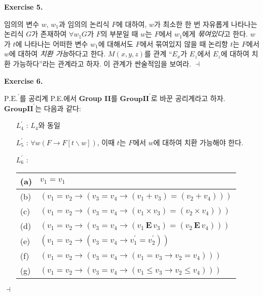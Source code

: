 \documentclass[12pt]{paper}
\newenvironment{context}[1][]
{ \noindent \textbf{{#1}.}
}
{ \hfill $ \dashv $ }
\begin{document}
\begin{context}[Exercise 5]
임의의 변수 $w$, $w_1$과 임의의 논리식 $F$에 대하여,
$w$가 최소한 한 번 자유롭게 나타나는 논리식 $G$가 존재하여
$\forall w_1 G$가 $F$의 부분일 때
$w$는 $F$에서 $w_1$에게 \textit{묶여있다}고 한다.
$w$가 $t$에 나타나는 어떠한 변수 $w_1$에 대해서도 $F$에서 묶여있지 않을 때
논리항 $t$는 $F$에서 $w$에 대하여 \textit{치환 가능}하다고 한다.
$M \left( x , y , z \right)$를 관계 ``$E_x$가 $E_z$에서 $E_z$에 대하여 치환 가능하다''라는 관계라고 하자.
이 관계가 싼술적임을 보여라.
\end{context}

\begin{context}[Exercise 6]
$\mathrm{P.E.}^{\prime}$를 공리계 P.E.에서 \textbf{Group II}를 $\mathbf{Group II}^{\prime}$로 바꾼 공리계라고 하자. \\
$\mathbf{Group II}^{\prime}$는 다음과 같다:
\begin{enumerate}
\item [$L_4^{\prime}$]: $L_4$와 동일
\item [$L_5^{\prime}$]: $\forall w \left( F \rightarrow F \left[ t \backslash w \right] \right)$,
이때 $t$는 $F$에서 $w$에 대하여 치환 가능해야 한다.
\item [$L_6^{\prime}$]:
\begin{tabular}{|l|l|} \hline
(a) & $ v_1 = v_1 $ \\ \hline
(b) & $ \left( v_1 = v_2 \rightarrow \left( v_3 = v_4 \rightarrow \left( v_1 + v_3 \right) = \left( v_2 + v_4 \right) \right) \right)$ \\ \hline
(c) & $ \left( v_1 = v_2 \rightarrow \left( v_3 = v_4 \rightarrow \left( v_1 \times v_3 \right) = \left( v_2 \times v_4 \right) \right) \right)$ \\ \hline
(d) & $ \left( v_1 = v_2 \rightarrow \left( v_3 = v_4 \rightarrow \left( v_1 \, \mathbf{E} \, v_3 \right) = \left( v_2 \, \mathbf{E} \, v_4 \right) \right) \right)$ \\ \hline
(e) & $ \left( v_1 = v_2 \rightarrow \left( v_3 = v_4 \rightarrow v_1^{\prime} = v_2^{\prime} \right) \right) $ \\ \hline
(f) & $ \left( v_1 = v_2 \rightarrow \left( v_3 = v_4 \rightarrow \left( v_1 = v_3 \rightarrow v_2 = v_4 \right) \right) \right) $ \\ \hline
(g) & $ \left( v_1 = v_2 \rightarrow \left( v_3 = v_4 \rightarrow \left( v_1 \le v_3 \rightarrow v_2 \le v_4 \right) \right) \right) $ \\ \hline
\end{tabular}
\end{enumerate}


\end{context}
\end{document}
